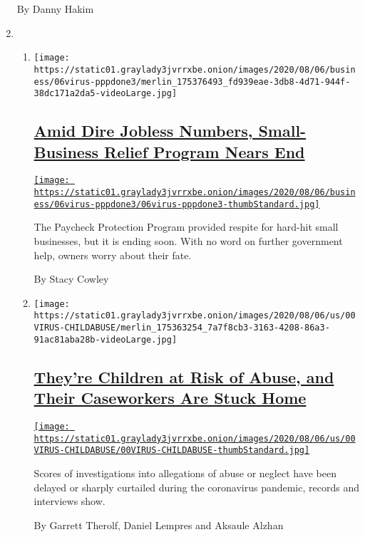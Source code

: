 \begin{enumerate}
  By Danny Hakim
\item
  \begin{enumerate}
  \def\labelenumii{\arabic{enumii}.}
  \item
    \texttt{[image: https://static01.graylady3jvrrxbe.onion/images/2020/08/06/business/06virus-pppdone3/merlin\_175376493\_fd939eae-3db8-4d71-944f-38dc171a2da5-videoLarge.jpg]}

    \hypertarget{amid-dire-jobless-numbers-small-business-relief-program-nears-end}{%
    \subsection{\texorpdfstring{\href{/2020/08/06/business/small-businesses-relief-program-ending.html}{Amid
    Dire Jobless Numbers, Small-Business Relief Program Nears
    End}}{Amid Dire Jobless Numbers, Small-Business Relief Program Nears End}}\label{amid-dire-jobless-numbers-small-business-relief-program-nears-end}}

    \href{/2020/08/06/business/small-businesses-relief-program-ending.html}{\texttt{[image: https://static01.graylady3jvrrxbe.onion/images/2020/08/06/business/06virus-pppdone3/06virus-pppdone3-thumbStandard.jpg]}}

    The Paycheck Protection Program provided respite for hard-hit small
    businesses, but it is ending soon. With no word on further
    government help, owners worry about their fate.

    By Stacy Cowley
  \item
    \texttt{[image: https://static01.graylady3jvrrxbe.onion/images/2020/08/06/us/00VIRUS-CHILDABUSE/merlin\_175363254\_7a7f8cb3-3163-4208-86a3-91ac81aba28b-videoLarge.jpg]}

    \hypertarget{theyre-children-at-risk-of-abuse-and-their-caseworkers-are-stuck-home}{%
    \subsection{\texorpdfstring{\href{/2020/08/07/us/virus-child-abuse.html}{They're
    Children at Risk of Abuse, and Their Caseworkers Are Stuck
    Home}}{They're Children at Risk of Abuse, and Their Caseworkers Are Stuck Home}}\label{theyre-children-at-risk-of-abuse-and-their-caseworkers-are-stuck-home}}

    \href{/2020/08/07/us/virus-child-abuse.html}{\texttt{[image: https://static01.graylady3jvrrxbe.onion/images/2020/08/06/us/00VIRUS-CHILDABUSE/00VIRUS-CHILDABUSE-thumbStandard.jpg]}}

    Scores of investigations into allegations of abuse or neglect have
    been delayed or sharply curtailed during the coronavirus pandemic,
    records and interviews show.

    By Garrett Therolf, Daniel Lempres and Aksaule Alzhan
  \end{enumerate}
\end{enumerate}

